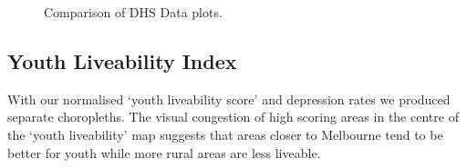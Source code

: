 \documentclass[a4, 11pt]{article}
\begin{document}
\begin{figure}[h]
    \captionsetup[subfigure]{labelformat=empty}
    \centering
    \caption{Comparison of DHS Data plots.}
\end{figure}

\newpage
\subsection{Youth Liveability Index}
With our normalised ‘youth liveability score’ and depression rates we produced separate choropleths. The visual congestion of high scoring areas in the centre of the ‘youth liveability’ map suggests that areas closer to Melbourne tend to be better for youth while more rural areas are less liveable. 
\end{document}
